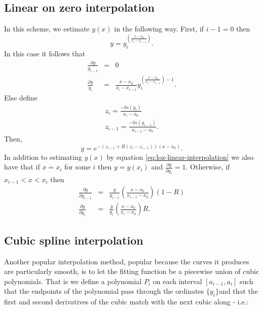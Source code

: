 \documentclass[a4paper]{article}
\newcommand{\yi}{\ensuremath{\{y_i\}}}
\begin{document}
\subsection{Linear on zero interpolation}
In this scheme, we estimate $y(x)$ in the following way. First, if $i-1 = 0$ then
\begin{equation}
  y = y^{\left(\frac{x-x_{0}}{x_{i}-x_{i-1}}\right)}_{i}.
\end{equation}In this case it follows that
\begin{eqnarray}
  \frac{\partial{y}}{y_{i-1}} & = & 0 \\
  \frac{\partial{y}}{y_{i}}   & = & \frac{x-x_{0}}{x_{i}-x_{i-1}}y_{i}^{\left(\frac{x-x_{0}}{x_{i}-x_{i-1}}\right)-1}.
\end{eqnarray}Else define
\begin{eqnarray*}
  z_{i} = \frac{-ln(y_{i})}{x_{i}-x_{0}} \\
 z_{i-1} = \frac{-ln(y_{i-1})}{x_{i-1}-x_{0}}.
\end{eqnarray*} Then,
\begin{equation}
  y = e^{-\left(z_{i-1} +R\left(z_{i}-z_{i-1}\right)\right)\left(x-x_{0}\right)}. \label{eq:loz-linear-interpolation}
\end{equation} In addition to estimating $y(x)$ by equation \ref{eq:loz-linear-interpolation} we also have that if $x = x_{i}$ for some $i$ then $y = y(x_{i})$ and $\frac{\partial{y}}{\partial{y_{i}}} = 1$. Otherwise, if $x_{i-1} < x < x_{i}$ then 
\begin{eqnarray}
  \frac{\partial{y}}{\partial{y_{i-1}}} & = & \frac{y}{y_{i-1}}\left(\frac{x-x_{0}}{x_{i-1}-x_{0}}\right)\left(1 - R\right) \\ 
  \frac{\partial{y}}{\partial{y_{i}}}   & = & \frac{y}{y_{i}}\left(\frac{x-x_{0}}{x_{i}-x_{0}}\right)R.
\end{eqnarray}

\subsection{Cubic spline interpolation}
Another popular interpolation method, popular because the curves it produces are particularly smooth,  is to let the fitting function be a piecewise union of cubic polynomials. That is we define a polynomial $P_i$ on each interval $[a_{i-1},a_i]$ such that the endpoints of the polynomial pass through the ordinates \yi and that the first and second derivatives of the cubic match with the next cubic along - i.e.:
\end{document}

